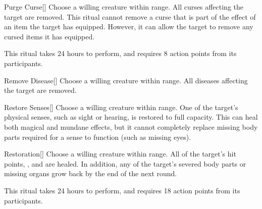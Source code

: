 \lowercase{\hypertarget{spell:Purge Curse}{}}\label{spell:Purge Curse}
\begin{apability}[\nth{2}]{\hypertarget{spell:Purge Curse}{Purge Curse}}[]
Choose a willing creature within \rngclose range.
All curses affecting the target are removed.
This ritual cannot remove a curse that is part of the effect of an item the target has equipped.
However, it can allow the target to remove any cursed items it has equipped.

This ritual takes 24 hours to perform, and requires 8 action points from its participants.
\end{apability}
\vspace{0.25em}



\lowercase{\hypertarget{spell:Remove Disease}{}}\label{spell:Remove Disease}
\begin{apability}[\nth{2}]{\hypertarget{spell:Remove Disease}{Remove Disease}}[]
Choose a willing creature within \rngmed range.
All diseases affecting the target are removed.
\end{apability}
\vspace{0.25em}



\lowercase{\hypertarget{spell:Restore Senses}{}}\label{spell:Restore Senses}
\begin{apability}[\nth{2}]{\hypertarget{spell:Restore Senses}{Restore Senses}}[]
Choose a willing creature within \rngmed range.
One of the target's physical senses, such as sight or hearing, is restored to full capacity.
This can heal both magical and mundane effects, but it cannot completely replace missing body parts required for a sense to function (such as missing eyes).
\end{apability}
\vspace{0.25em}



\lowercase{\hypertarget{spell:Restoration}{}}\label{spell:Restoration}
\begin{apability}[\nth{3}]{\hypertarget{spell:Restoration}{Restoration}}[]
Choose a willing creature within \rngclose range.
All of the target's hit points, , and  are healed.
In addition, any of the target's severed body parts or missing organs grow back by the end of the next round.

This ritual takes 24 hours to perform, and requires 18 action points from its participants.
\end{apability}
\vspace{0.25em}



